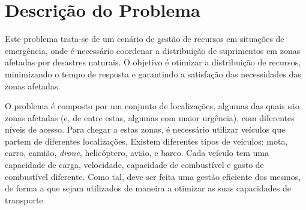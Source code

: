 \documentclass[a4paper,12pt]{scrreprt}
\begin{document}
\pagebreak




\renewcommand{\contentsname}{Índice}
\renewcommand{\listfigurename}{Índice de Figuras}
\renewcommand{\listtablename}{Índice de Tabelas}

\tableofcontents
\pagebreak

\listoffigures
\pagebreak

\listoftables
\pagebreak





\chapter{Descrição do Problema}

Este problema trata-se de um cenário de gestão de recursos em situações de emergência, onde é 
necessário coordenar a distribuição de suprimentos em zonas afetadas por desastres naturais.
O objetivo é otimizar a distribuição de recursos, minimizando o tempo de resposta e garantindo a
satisfação das necessidades das zonas afetadas.

O problema é composto por um conjunto de localizações, algumas das quais são zonas afetadas (e, de entre
estas, algumas com maior urgência), com diferentes níveis de acesso. Para chegar a estas zonas, é necessário utilizar veículos que partem
de diferentes localizações. Existem diferentes tipos de veículos: mota, carro, camião, \textit{drone}, helicóptero,
avião, e barco. Cada veículo tem uma capacidade de carga, velocidade, capacidade de combustível e gasto de combustível
diferente. Como tal, deve ser feita uma gestão eficiente dos mesmos, de forma a que sejam utilizados de maneira
a otimizar as suas capacidades de transporte.
\end{document}
